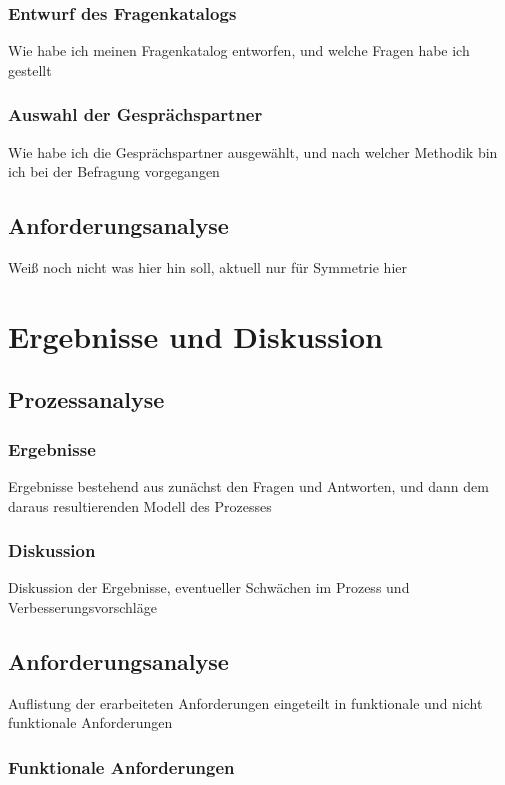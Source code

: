 \documentclass[11pt,a4paper]{scrartcl}
\begin{document}
\subsubsection{Entwurf des Fragenkatalogs}\label{subsubsec:entwurf-fragenkatalog}
Wie habe ich meinen Fragenkatalog entworfen, und welche Fragen habe ich gestellt
\subsubsection{Auswahl der Gesprächspartner}\label{subsubsec:auswahl-gespraechspartner}
Wie habe ich die Gesprächspartner ausgewählt, und nach welcher Methodik bin ich bei der Befragung vorgegangen
\subsection{Anforderungsanalyse}\label{subsec:anforderungsanalyse-methodik}
Weiß noch nicht was hier hin soll, aktuell nur für Symmetrie hier

\section{Ergebnisse und Diskussion}\label{sec:results}
\subsection{Prozessanalyse}\label{subsec:prozessanalyse-results}
\subsubsection{Ergebnisse}\label{subsubsec:prozessanalyse-results}
Ergebnisse bestehend aus zunächst den Fragen und Antworten, und dann dem daraus resultierenden Modell des Prozesses
\subsubsection{Diskussion}\label{subsubsec:prozessanalyse-discussion}
Diskussion der Ergebnisse, eventueller Schwächen im Prozess und Verbesserungsvorschläge
\subsection{Anforderungsanalyse}\label{subsec:anforderungsanalyse-results}
Auflistung der erarbeiteten Anforderungen eingeteilt in funktionale und nicht funktionale Anforderungen
\subsubsection{Funktionale Anforderungen}\label{subsubsec:functional-requirements}
\end{document}

